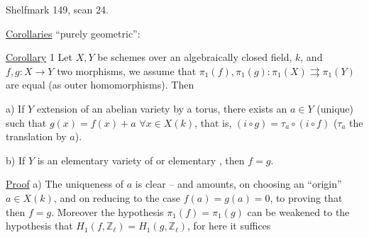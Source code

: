 Shelfmark 149, scan 24.

\uline{Corollaries} ``purely geometric'':

\uline{Corollary} 1 Let $X,Y$ be  schemes over an algebraically closed field, $k$, and $f,g:X\longrightarrow Y$ two morphisms, we assume that $\pi_1(f),\pi_1(g):\pi_1(X)\rightrightarrows\pi_1(Y)$ are equal (as outer homomorphisms). Then

a) If $Y$   extension of an abelian variety by a torus, there exists an $a\in Y$ (unique) such that $g(x)=f(x)+a$ $\forall x\in X(k)$, that is, $(i\circ g)=\tau_a\circ(i\circ f)$ ($\tau_a$ the translation by $a$).

b) If $Y$ is an elementary variety of  or   elementary ,  then $f=g$.


\uline{Proof} a) The uniqueness of $a$ is clear -- and   amounts,  on choosing an ``origin'' $a\in X(k)$, and on reducing to the case $f(a)=g(a)=0$, to proving that then $f=g$. Moreover the hypothesis $\pi_1(f)=\pi_1(g)$ can be weakened to the hypothesis that  $H_1(f,\mathbb Z_\ell)=H_1(g,\mathbb Z_\ell)$,  for here it suffices
